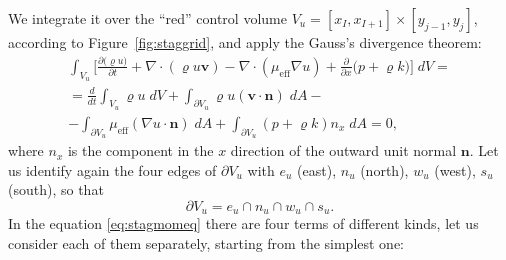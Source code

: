 We integrate it over the ``red'' control volume $V_u=[x_I, 
x_{I+1}]\times[y_{j-1},y_j]$, 
according to Figure~\ref{fig:staggrid}, and apply the Gauss's divergence 
theorem:
\begin{multline} \label{eq:stagmomeq}
\int_{V_u} \bigg[ \frac{\partial{(\varrho u})}{\partial t} + \nabla 
\cdot (\varrho u \mathbf{v} ) - \nabla \cdot (\mu_\text{eff} \nabla u) + 
\frac{\partial}{\partial x}\big( p + \varrho k \big) \bigg ]\; dV 
=\\
=\frac{d}{dt} \int_{V_u} \varrho u\; dV + \int_{\partial V_u} \varrho u 
(\mathbf{v} \cdot \mathbf{n}) \; dA -\\
- \int_{\partial V_u} \mu_\text{eff} 
(\nabla u \cdot \mathbf{n}) \; dA + \int_{\partial V_u} (p + \varrho k) n_x \; 
dA = 0,
\end{multline}
where $n_x$ is the component in the $x$ direction of the outward unit 
normal $\mathbf{n}$. Let us identify again the four edges of $\partial V_u$ 
with $e_u$ (east), $n_u$ (north), $w_u$ (west), $s_u$ (south), so that
\begin{equation}
	\partial V_u = e_u \cap n_u \cap w_u \cap s_u.
\end{equation}
In the equation \eqref{eq:stagmomeq} there are four terms of different kinds, 
let us consider each of them separately, starting from the simplest one:
